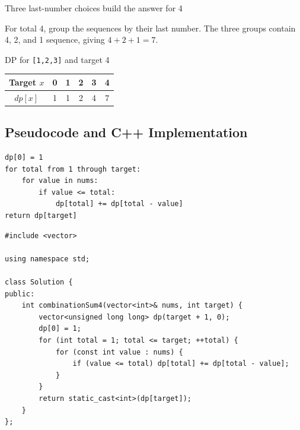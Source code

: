 \begin{visualbox}{Three last-number choices build the answer for 4}
\centering
{}

\smallskip
For total 4, group the sequences by their last number. The three groups contain
4, 2, and 1 sequence, giving \(4+2+1=7\).
\end{visualbox}

\begin{dryrunbox}{DP for \texttt{[1,2,3]} and target 4}
\begin{center}
\begin{tabular}{c|ccccc}
Target \(x\) & 0 & 1 & 2 & 3 & 4 \\ \hline
\(dp[x]\) & 1 & 1 & 2 & 4 & 7
\end{tabular}
\end{center}
\end{dryrunbox}

\subsection{Pseudocode and C++ Implementation}
\begin{lstlisting}[style=pseudocode]
dp[0] = 1
for total from 1 through target:
    for value in nums:
        if value <= total:
            dp[total] += dp[total - value]
return dp[target]
\end{lstlisting}

\begin{lstlisting}[style=compactcode,caption={Complete C++ solution: Combination Sum IV}]
#include <vector>

using namespace std;

class Solution {
public:
    int combinationSum4(vector<int>& nums, int target) {
        vector<unsigned long long> dp(target + 1, 0);
        dp[0] = 1;
        for (int total = 1; total <= target; ++total) {
            for (const int value : nums) {
                if (value <= total) dp[total] += dp[total - value];
            }
        }
        return static_cast<int>(dp[target]);
    }
};
\end{lstlisting}

